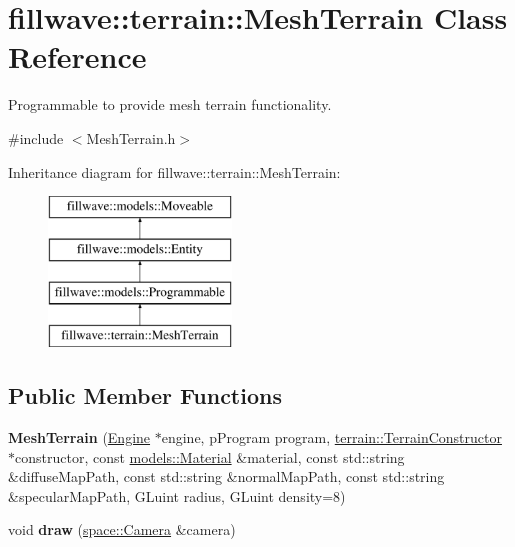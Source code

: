 \hypertarget{classfillwave_1_1terrain_1_1MeshTerrain}{}\section{fillwave\+:\+:terrain\+:\+:Mesh\+Terrain Class Reference}
\label{classfillwave_1_1terrain_1_1MeshTerrain}


Programmable to provide mesh terrain functionality.  




{\ttfamily \#include $<$Mesh\+Terrain.\+h$>$}

Inheritance diagram for fillwave\+:\+:terrain\+:\+:Mesh\+Terrain\+:\begin{figure}[H]
\begin{center}
\leavevmode
\includegraphics[height=4.000000cm]{classfillwave_1_1terrain_1_1MeshTerrain}
\end{center}
\end{figure}
\subsection*{Public Member Functions}
\begin{DoxyCompactItemize}
\item 
\hypertarget{classfillwave_1_1terrain_1_1MeshTerrain_a99c353aa895746c227ac17233ded6827}{}{\bfseries Mesh\+Terrain} (\hyperlink{classfillwave_1_1Engine}{Engine} $\ast$engine, p\+Program program, \hyperlink{classfillwave_1_1terrain_1_1TerrainConstructor}{terrain\+::\+Terrain\+Constructor} $\ast$constructor, const \hyperlink{classfillwave_1_1models_1_1Material}{models\+::\+Material} \&material, const std\+::string \&diffuse\+Map\+Path, const std\+::string \&normal\+Map\+Path, const std\+::string \&specular\+Map\+Path, G\+Luint radius, G\+Luint density=8)\label{classfillwave_1_1terrain_1_1MeshTerrain_a99c353aa895746c227ac17233ded6827}

\item 
\hypertarget{classfillwave_1_1terrain_1_1MeshTerrain_a43c39831c3a77fc391e0716b3e595533}{}void {\bfseries draw} (\hyperlink{classfillwave_1_1space_1_1Camera}{space\+::\+Camera} \&camera)\label{classfillwave_1_1terrain_1_1MeshTerrain_a43c39831c3a77fc391e0716b3e595533}

\end{DoxyCompactItemize}
